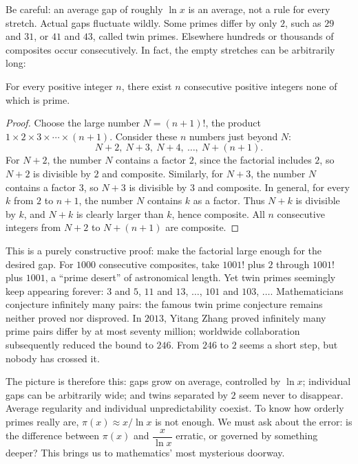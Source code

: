 Be careful: an average gap of roughly $\ln x$ is an average, not a rule for every stretch. Actual gaps fluctuate wildly. Some primes differ by only $2$, such as $29$ and $31$, or $41$ and $43$, called twin primes. Elsewhere hundreds or thousands of composites occur consecutively. In fact, the empty stretches can be arbitrarily long:

\begin{dingli}
For every positive integer $n$, there exist $n$ consecutive positive integers none of which is prime.
\end{dingli}

\begin{proof}
Choose the large number $N=(n+1)!$, the product $1\times2\times3\times\cdots\times(n+1)$. Consider these $n$ numbers just beyond $N$:
\[
N+2,\ N+3,\ N+4,\ \dots,\ N+(n+1).
\]
For $N+2$, the number $N$ contains a factor $2$, since the factorial includes $2$, so $N+2$ is divisible by $2$ and composite. Similarly, for $N+3$, the number $N$ contains a factor $3$, so $N+3$ is divisible by $3$ and composite. In general, for every $k$ from $2$ to $n+1$, the number $N$ contains $k$ as a factor. Thus $N+k$ is divisible by $k$, and $N+k$ is clearly larger than $k$, hence composite. All $n$ consecutive integers from $N+2$ to $N+(n+1)$ are composite.
\end{proof}

This is a purely constructive proof: make the factorial large enough for the desired gap. For $1000$ consecutive composites, take $1001!$ plus $2$ through $1001!$ plus $1001$, a ``prime desert'' of astronomical length. Yet twin primes seemingly keep appearing forever: $3$ and $5$, $11$ and $13$, $\dots$, $101$ and $103$, $\dots$. Mathematicians conjecture infinitely many pairs: the famous twin prime conjecture remains neither proved nor disproved. In $2013$, Yitang Zhang proved infinitely many prime pairs differ by at most seventy million; worldwide collaboration subsequently reduced the bound to $246$. From $246$ to $2$ seems a short step, but nobody has crossed it.

The picture is therefore this: gaps grow on average, controlled by $\ln x$; individual gaps can be arbitrarily wide; and twins separated by $2$ seem never to disappear. Average regularity and individual unpredictability coexist. To know how orderly primes really are, $\pi(x)\approx x/\ln x$ is not enough. We must ask about the error: is the difference between $\pi(x)$ and $\dfrac{x}{\ln x}$ erratic, or governed by something deeper? This brings us to mathematics' most mysterious doorway.

